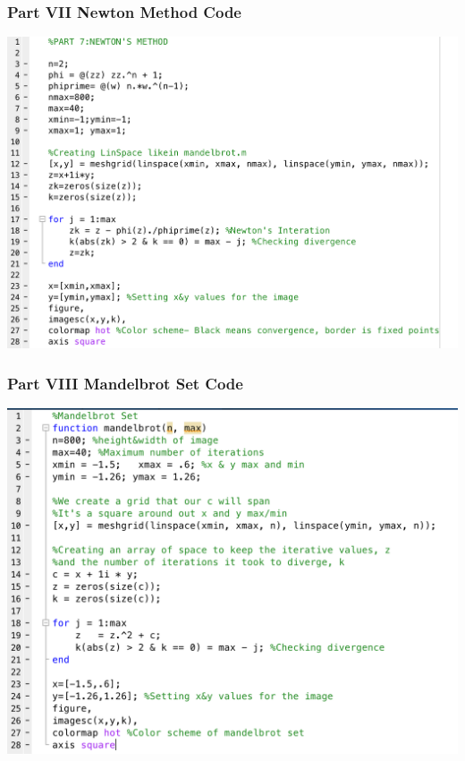 \documentclass[11pt]{article}
\theoremstyle{plain}
\theoremstyle{definition}
\begin{document}
\subsubsection*{Part VII Newton Method Code}
\includegraphics*[scale = 0.35]{Part7Code.png}
\subsubsection*{Part VIII Mandelbrot Set Code}
\includegraphics*[scale = 0.35]{Part8Code.png}
\end{document}
